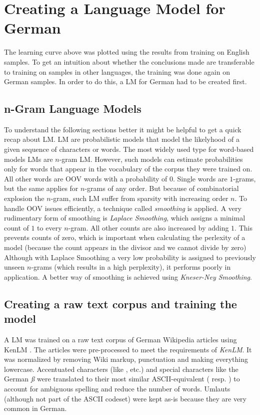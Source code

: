 \section{Creating a Language Model for German}\label{lm}

The learning curve above was plotted using the results from training on English samples. To get an intuition about whether the conclusions made are transferable to training on samples in other languages, the training was done again on German samples. In order to do this, a \ac{LM} for German had to be created first.

\subsection{n-Gram Language Models}

To understand the following sections better it might be helpful to get a quick recap about \ac{LM}. \ac{LM} are probabilistic models that model the likelyhood of a given sequence of characters or words. The most widely used type for word-based models \ac{LM}s are $n$-gram \ac{LM}. However, such models can estimate probabilities only for words that appear in the vocabulary of the corpus they were trained on. All other words are \ac{OOV} words with a probability of $0$. Single words are $1$-grams, but the same applies for $n$-grams of any order. But because of combinatorial explosion the $n$-gram, such \ac{LM} suffer from sparsity with increasing order $n$. To handle \ac{OOV} issues efficiently, a technique called \textit{smoothing} is applied. A very rudimentary form of smoothing is \textit{Laplace Smoothing}, which assigns a minimal count of $1$ to every $n$-gram. All other counts are also increased by adding $1$. This prevents counts of zero, which is important when calculating the perlexity of a model (because the count appears in the divisor and we cannot divide by zero) Although with Laplace Smoothing a very low probability is assigned to previously unseen $n$-grams (which results in a high perplexity), it performs poorly in application. A better way of smoothing is achieved using \textit{Kneser-Ney Smoothing}.

\subsection{Creating a raw text corpus and training the model}

A LM was trained on a raw text corpus of German Wikipedia articles using KenLM \parencite{kenlm}. The articles were pre-processed to meet the requirements of \textit{KenLM}.
It was normalized by removing Wiki markup, punctuation and making everything lowercase. Accentuated characters (like , etc.) and special characters like the German \textit{ß} were translated to their most similar ASCII-equivalent ( resp. ) to account for ambiguous spelling and reduce the number of words. Umlauts (although not part of the ASCII codeset) were kept as-is because they are very common in German.

